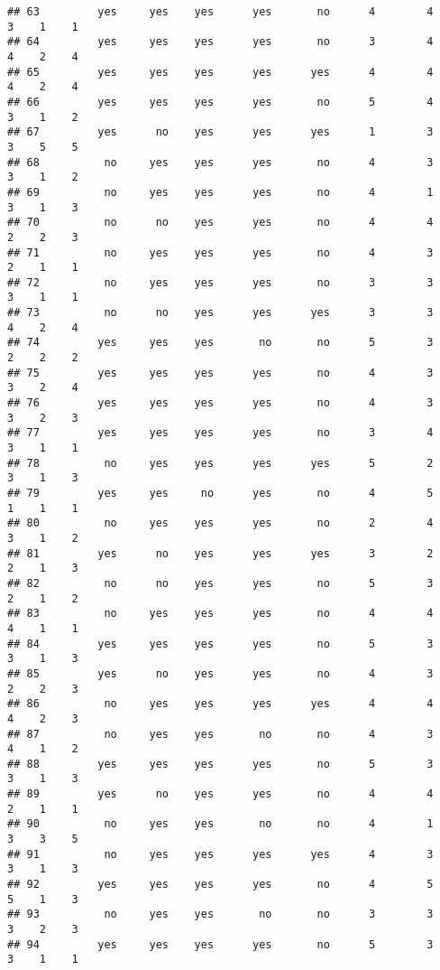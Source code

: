 \documentclass[
]{article}
\begin{document}
\begin{verbatim}
## 63         yes     yes    yes      yes       no      4        4     3    1    1
## 64         yes     yes    yes      yes       no      3        4     4    2    4
## 65         yes     yes    yes      yes      yes      4        4     4    2    4
## 66         yes     yes    yes      yes       no      5        4     3    1    2
## 67         yes      no    yes      yes      yes      1        3     3    5    5
## 68          no     yes    yes      yes       no      4        3     3    1    2
## 69          no     yes    yes      yes       no      4        1     3    1    3
## 70          no      no    yes      yes       no      4        4     2    2    3
## 71          no     yes    yes      yes       no      4        3     2    1    1
## 72          no     yes    yes      yes       no      3        3     3    1    1
## 73          no      no    yes      yes      yes      3        3     4    2    4
## 74         yes     yes    yes       no       no      5        3     2    2    2
## 75         yes     yes    yes      yes       no      4        3     3    2    4
## 76         yes     yes    yes      yes       no      4        3     3    2    3
## 77         yes     yes    yes      yes       no      3        4     3    1    1
## 78          no     yes    yes      yes      yes      5        2     3    1    3
## 79         yes     yes     no      yes       no      4        5     1    1    1
## 80          no     yes    yes      yes       no      2        4     3    1    2
## 81         yes      no    yes      yes      yes      3        2     2    1    3
## 82          no      no    yes      yes       no      5        3     2    1    2
## 83          no     yes    yes      yes       no      4        4     4    1    1
## 84         yes     yes    yes      yes       no      5        3     3    1    3
## 85         yes      no    yes      yes       no      4        3     2    2    3
## 86          no     yes    yes      yes      yes      4        4     4    2    3
## 87          no     yes    yes       no       no      4        3     4    1    2
## 88         yes     yes    yes      yes       no      5        3     3    1    3
## 89         yes      no    yes      yes       no      4        4     2    1    1
## 90          no     yes    yes       no       no      4        1     3    3    5
## 91          no     yes    yes      yes      yes      4        3     3    1    3
## 92         yes     yes    yes      yes       no      4        5     5    1    3
## 93          no     yes    yes       no       no      3        3     3    2    3
## 94         yes     yes    yes      yes       no      5        3     3    1    1

\end{verbatim}
\end{document}
